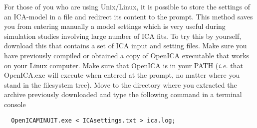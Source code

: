 For those of you who are using Unix/Linux, it is possible to store the settings of an ICA-model in a file and redirect its content to the prompt. This method saves you from entering manually a model settings which is very useful during simulation studies involving large number of ICA fits. To try this by yourself, download this  that contains a set of ICA input and setting files.  Make sure you have previously compiled or obtained a copy of OpenICA executable that works on your Linux computer. Make sure that OpenICA is in your PATH ({\it i.e.} that OpenICA.exe will execute when entered at the prompt, no matter where you stand in the filesystem tree). Move to the directory where you extracted the archive previously downloaded and type the following command in a terminal console 

\begin{verbatim}  OpenICAMINUIT.exe < ICAsettings.txt > ica.log; \end{verbatim}

